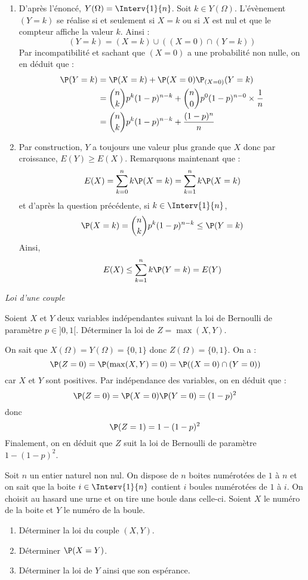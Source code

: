 \documentclass[a4paper,10pt]{report}
\begin{document}
\corr 

\begin{enumerate}
\item D'après l'énoncé, $Y(\Omega) = \Interv{1}{n}$. Soit $k \in Y(\Omega)$. L'évènement $(Y=k)$ se réalise si et seulement si $X=k$ ou si $X$ est nul et que le compteur affiche la valeur $k$. Ainsi :
$$ (Y=k) = (X=k) \cup ((X=0) \cap (Y=k))$$
Par incompatibilité et sachant que $(X=0)$ a une probabilité non nulle, on en déduit que :
\begin{align*}
 \P(Y=k) & = \P(X=k) + \P(X=0) \P_{(X=0)}(Y=k) \\
 & = \binom{n}{k} p^k (1-p)^{n-k} + \binom{n}{0} p^0 (1-p)^{n-0} \times \dfrac{1}{n} \\
 & = \binom{n}{k} p^k (1-p)^{n-k} + \dfrac{(1-p)^n}{n}
 \end{align*}
 \item Par construction, $Y$ a toujours une valeur plus grande que $X$ donc par croissance, $E(Y) \geq E(X)$. Remarquons maintenant que :
 $$ E(X) = \sum_{k=0}^n k \P(X=k) =  \sum_{k=1}^n k \P(X=k)$$
 et d'après la question précédente, si $k \in \Interv{1}{n}$,
 $$ \P(X=k) = \binom{n}{k} p^k (1-p)^{n-k}  \leq \P(Y=k)$$
 Ainsi,
 $$ E(X) \leq \sum_{k=1}^n k \P(Y=k) = E(Y)$$
\end{enumerate}

\medskip

\begin{center}
\textit{{ {\large Loi d'une couple}}}
\end{center}

\medskip

\begin{Exa} Soient $X$ et $Y$ deux variables indépendantes suivant la loi de Bernoulli de paramètre $p \in ]0,1[$. Déterminer la loi de $Z= \max(X,Y)$.
\end{Exa}

\corr On sait que $X(\Omega) = Y(\Omega) = \lbrace 0,1 \rbrace$ donc $Z(\Omega) = \lbrace 0,1 \rbrace$. On a :
$$ \P(Z=0) = \P(\max(X,Y)=0) = \P((X=0) \cap (Y=0))$$
car $X$ et $Y$ sont positives. Par indépendance des variables, on en déduit que :
$$ \P(Z=0) = \P(X=0) \P(Y=0) = (1-p)^2$$
donc 
$$ \P(Z=1) = 1- (1-p)^2$$
Finalement, on en déduit que $Z$ suit la loi de Bernoulli de paramètre $1-(1-p)^2$.

\begin{Exa} Soit $n$ un entier naturel non nul. On dispose de $n$ boites numérotées de $1$ à $n$ et on sait que la boite $i \in \Interv{1}{n}$ contient $i$ boules numérotées de $1$ à $i$. On choisit au hasard une urne et on tire une boule dans celle-ci. Soient $X$ le numéro de la boite et $Y$ le numéro de la boule. 

\begin{enumerate}
\item Déterminer la loi du couple $(X,Y)$.
\item Déterminer $\P(X=Y)$.
\item Déterminer la loi de $Y$ ainsi que son espérance.
\end{enumerate}
\end{Exa}
\end{document}
